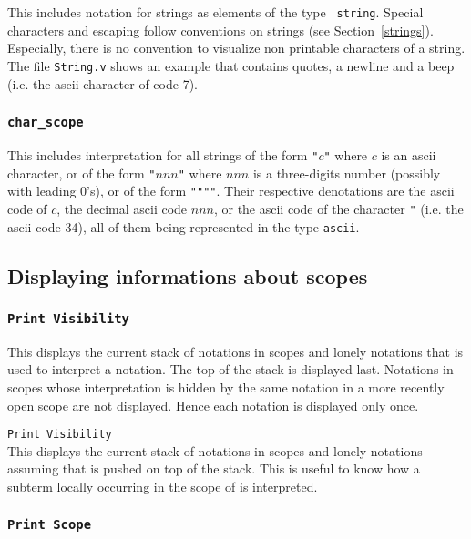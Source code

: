 This includes notation for strings as elements of the type {\tt
string}.  Special characters and escaping follow {\Coq} conventions
on strings (see Section~\ref{strings}). Especially, there is no
convention to visualize non printable characters of a string.  The
file {\tt String.v} shows an example that contains quotes, a newline
and a beep (i.e. the ascii character of code 7).

\subsubsection{\tt char\_scope}

This includes interpretation for all strings of the form
\verb!"!$c$\verb!"! where $c$ is an ascii character, or of the form
\verb!"!$nnn$\verb!"! where $nnn$ is a three-digits number (possibly
with leading 0's), or of the form \verb!""""!. Their respective
denotations are the ascii code of $c$, the decimal ascii code $nnn$,
or the ascii code of the character \verb!"! (i.e. the ascii code
34), all of them being represented in the type {\tt ascii}.

\subsection{Displaying informations about scopes}

\subsubsection{\tt Print Visibility}

This displays the current stack of notations in scopes and lonely
notations that is used to interpret a notation. The top of the stack
is displayed last. Notations in scopes whose interpretation is hidden
by the same notation in a more recently open scope are not
displayed. Hence each notation is displayed only once.

\variant

{\tt Print Visibility {\scope}}\\

This displays the current stack of notations in scopes and lonely
notations assuming that {\scope} is pushed on top of the stack.  This
is useful to know how a subterm locally occurring in the scope of
{\scope} is interpreted.

\subsubsection{\tt Print Scope {\scope}}

